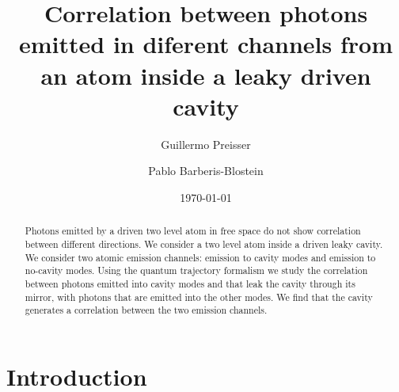 \documentclass[%
 reprint,
 amsmath,amssymb,
 aps, 
]{revtex4-1}
\begin{document}

\title{Correlation between photons emitted in diferent channels from
  an atom inside a leaky driven cavity}%

\author{Guillermo Preisser}
\author{Pablo Barberis-Blostein}%



\date{\today}%

\begin{abstract}
  Photons emitted by a driven two level atom in free space do not show
  correlation between different directions. We consider a two level
  atom inside a driven leaky cavity. We consider two atomic emission
  channels: emission to cavity modes and emission to no-cavity modes.
  Using the quantum trajectory formalism we study the correlation
  between photons emitted into cavity modes and that leak the cavity
  through its mirror, with photons that are emitted into the other
  modes. We find that the cavity generates a correlation between the
  two emission channels.
\end{abstract}

\maketitle


\section{Introduction}
\end{document}
